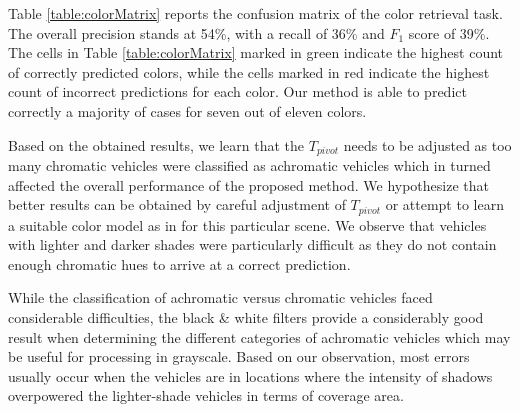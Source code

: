 \documentclass[runningheads]{llncs}
\newcommand{\ian}[1]{\textcolor{red}{#1}}
\newcommand{\ian}[1]{}   %
\begin{document}
Table \ref{table:colorMatrix} reports the confusion matrix of the color retrieval task. 
The overall precision stands at 54\%, with a recall of 36\% and $F_1$ score of 39\%. The cells in Table \ref{table:colorMatrix} marked in green indicate the highest count of correctly predicted colors, while the cells marked in red indicate the highest count of incorrect predictions for each color. Our method is able to predict correctly a majority of cases for seven out of eleven colors.

Based on the obtained results, we learn that the $T_{pivot}$ needs to be adjusted as too many chromatic vehicles were classified as achromatic vehicles which in turned affected the overall performance of the proposed method. We hypothesize that better results can be obtained by careful adjustment of $T_{pivot}$ or attempt to learn a suitable color model as in \cite{hu2015vehicle,rachmadi2015vehicle} for this particular scene. We observe that vehicles with lighter and darker shades were particularly difficult as they do not contain enough chromatic hues to arrive at a correct prediction.  

While the classification of achromatic versus chromatic vehicles faced considerable difficulties, the black \& white filters provide a considerably good result when determining the different categories of achromatic vehicles which may be useful for processing in grayscale. Based on our observation, most errors usually occur when the vehicles are in locations where the intensity of shadows overpowered the lighter-shade vehicles in terms of coverage area. 
\end{document}
